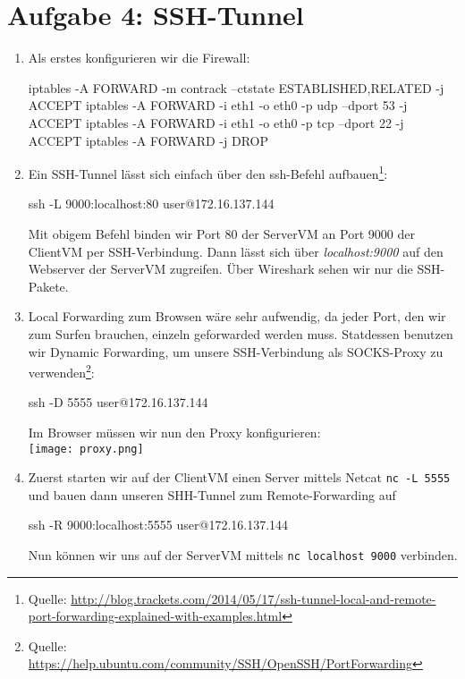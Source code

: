 \documentclass[a4paper,10pt]{scrartcl}
\begin{document}
	\section*{Aufgabe 4: SSH-Tunnel}
	\label{sec:SSH-Tunnel}
	\begin{enumerate}[\bfseries 1.]
		\item
		    Als erstes konfigurieren wir die Firewall:
            \begin{rootcommands}
iptables -A FORWARD -m contrack --ctstate ESTABLISHED,RELATED -j ACCEPT
iptables -A FORWARD -i eth1 -o eth0 -p udp --dport 53 -j ACCEPT
iptables -A FORWARD -i eth1 -o eth0 -p tcp --dport 22 -j ACCEPT
iptables -A FORWARD -j DROP
            \end{rootcommands}

	\item
		Ein SSH-Tunnel lässt sich einfach über den ssh-Befehl aufbauen\footnote{Quelle: \url{http://blog.trackets.com/2014/05/17/ssh-tunnel-local-and-remote-port-forwarding-explained-with-examples.html}}:
        \begin{usercommands}
ssh -L 9000:localhost:80 user@172.16.137.144
        \end{usercommands}
		Mit obigem Befehl binden wir Port 80 der ServerVM an Port 9000 der ClientVM
		per SSH-Verbindung. Dann lässt sich über \textit{localhost:9000} auf den
		Webserver der ServerVM zugreifen. Über Wireshark sehen wir nur die
		SSH-Pakete.\\

	\item
	    Local Forwarding zum Browsen wäre sehr aufwendig, da jeder Port, den
		wir zum Surfen brauchen, einzeln geforwarded werden muss.
		Statdessen benutzen wir Dynamic Forwarding, um unsere SSH-Verbindung als
		SOCKS-Proxy zu verwenden\footnote{Quelle: \url{https://help.ubuntu.com/community/SSH/OpenSSH/PortForwarding}}:
        \begin{usercommands}
ssh -D 5555 user@172.16.137.144
        \end{usercommands}
		Im Browser müssen wir nun den Proxy konfigurieren:\\
        \texttt{[image: proxy.png]}

    \item
		Zuerst starten wir auf der ClientVM einen Server mittels Netcat
		\texttt{nc -L 5555} und bauen dann unseren SHH-Tunnel zum Remote-Forwarding
		auf
        \begin{usercommands}
ssh -R 9000:localhost:5555 user@172.16.137.144
        \end{usercommands}
        Nun können wir uns auf der ServerVM mittels \texttt{nc localhost 9000} verbinden.
	\end{enumerate}
\end{document}
